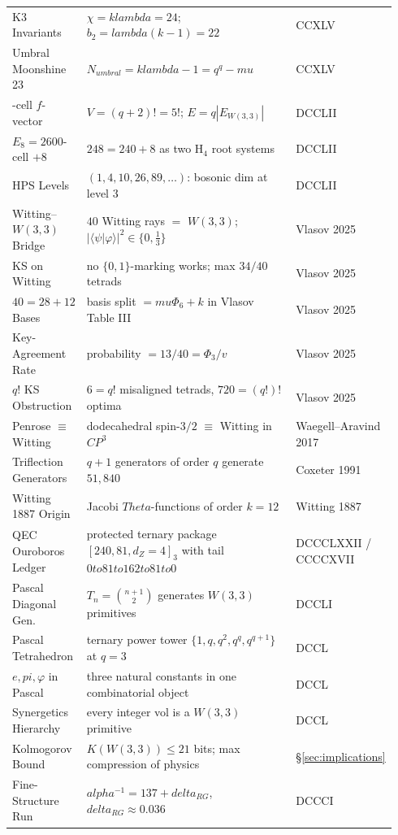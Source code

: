 \documentclass[11pt]{article}
\def\mathbb#1{#1}%
\def\mathrm#1{#1}%
\def\text#1{#1}%
\def\alpha{alpha}%
\def\delta{delta}%
\def\lambda{lambda}%
\def\mu{mu}%
\def\Phi#1{Phi#1}%
\def\pi{pi}%
\def\Theta{Theta}%
\def\cdot{ }%
\def\to{ to }%
\begin{document}
{\begin{longtable}{>{\raggedright\arraybackslash}p{0.18\linewidth} >{\raggedright\arraybackslash}p{0.63\linewidth} >{\raggedright\arraybackslash}p{0.13\linewidth}}
K3 Invariants & $\chi = k\lambda = 24$; $b_2 = \lambda(k{-}1) = 22$ & CCXLV \\
Umbral Moonshine 23 & $N_{\text{umbral}} = k\lambda - 1 = q^q - \mu$ & CCXLV \\
600-cell $f$-vector & $V = (q{+}2)! = 5!$; $E = q \cdot |E_{W(3,3)}|$ & DCCLII \\
$E_8 = 2 \cdot 600$-cell $+ 8$ & $248 = 240 + 8$ as two H$_4$ root systems & DCCLII \\
HPS Levels & $(1, 4, 10, 26, 89, \ldots)$: bosonic dim at level 3 & DCCLII \\
Witting--$W(3,3)$ Bridge & $40$ Witting rays $=$ $W(3,3)$; $|\langle\psi|\varphi\rangle|^2\in\{0,\tfrac13\}$ & Vlasov 2025 \\
KS on Witting & no $\{0,1\}$-marking works; max $34/40$ tetrads & Vlasov 2025 \\
$40 = 28 + 12$ Bases & basis split $= \mu\Phi_6 + k$ in Vlasov Table III & Vlasov 2025 \\
Key-Agreement Rate & probability $= 13/40 = \Phi_3/v$ & Vlasov 2025 \\
$q!$ KS Obstruction & $6 = q!$ misaligned tetrads, $720 = (q!)!$ optima & Vlasov 2025 \\
Penrose $\equiv$ Witting & dodecahedral spin-$3/2$ $\equiv$ Witting in $\mathbb{CP}^3$ & Waegell--Aravind 2017 \\
Triflection Generators & $q+1$ generators of order $q$ generate $51{,}840$ & Coxeter 1991 \\
Witting 1887 Origin & Jacobi $\Theta$-functions of order $k = 12$ & Witting 1887 \\
QEC Ouroboros Ledger & protected ternary package $[240,81,d_Z=4]_3$ with tail $0\to81\to162\to81\to0$ & DCCCLXXII / CCCCXVII \\
Pascal Diagonal Gen.\ & $T_n = \binom{n+1}{2}$ generates $W(3,3)$ primitives & DCCLI \\
Pascal Tetrahedron & ternary power tower $\{1, q, q^2, q^q, q^{q+1}\}$ at $q=3$ & DCCL \\
$e, \pi, \varphi$ in Pascal & three natural constants in one combinatorial object & DCCL \\
Synergetics Hierarchy & every integer vol is a $W(3,3)$ primitive & DCCL \\
Kolmogorov Bound & $K(W(3,3)) \leq 21$ bits; max compression of physics & \S\ref{sec:implications} \\
Fine-Structure Run & $\alpha^{-1} = 137 + \delta_{\mathrm{RG}}$, $\delta_{\mathrm{RG}}\approx 0.036$ & DCCCI \\

\end{longtable}}
\end{document}
